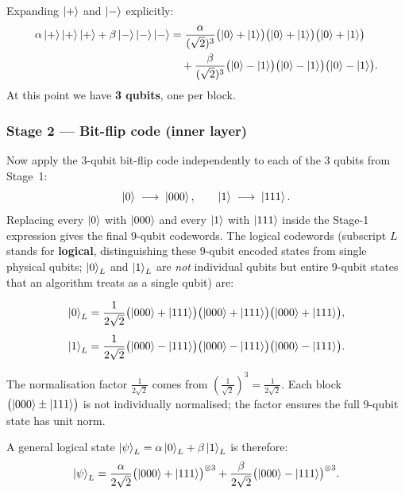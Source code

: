 \documentclass[11pt, a4paper]{article}
\theoremstyle{definition}
\theoremstyle{plain}
\theoremstyle{remark}
\begin{document}
\medskip
Expanding $\ket{+}$ and $\ket{-}$ explicitly:
\begin{align*}
  \alpha\ket{+}\ket{+}\ket{+} + \beta\ket{-}\ket{-}\ket{-}
  &= \frac{\alpha}{(\sqrt{2})^3}
    \bigl(\ket{0}+\ket{1}\bigr)
    \bigl(\ket{0}+\ket{1}\bigr)
    \bigl(\ket{0}+\ket{1}\bigr)\\
  &\quad+\frac{\beta}{(\sqrt{2})^3}
    \bigl(\ket{0}-\ket{1}\bigr)
    \bigl(\ket{0}-\ket{1}\bigr)
    \bigl(\ket{0}-\ket{1}\bigr).
\end{align*}
At this point we have \textbf{3 qubits}, one per block.

\subsubsection*{Stage 2 --- Bit-flip code (inner layer)}

Now apply the 3-qubit bit-flip code independently to each of the 3 qubits
from Stage~1:
\[
  \ket{0} \;\longrightarrow\; \ket{000}, \qquad
  \ket{1} \;\longrightarrow\; \ket{111}.
\]
Replacing every $\ket{0}$ with $\ket{000}$ and every $\ket{1}$ with
$\ket{111}$ inside the Stage-1 expression gives the final 9-qubit
codewords. The logical codewords (subscript $L$ stands for \textbf{logical},
distinguishing these 9-qubit encoded states from single physical qubits;
$\ket{0}_L$ and $\ket{1}_L$ are \emph{not} individual qubits but entire
9-qubit states that an algorithm treats as a single qubit) are:

\begin{align}
  \ket{0}_L &= \frac{1}{2\sqrt{2}}
    \bigl(\ket{000}+\ket{111}\bigr)
    \bigl(\ket{000}+\ket{111}\bigr)
    \bigl(\ket{000}+\ket{111}\bigr), \label{eq:shor-0}\\[4pt]
  \ket{1}_L &= \frac{1}{2\sqrt{2}}
    \bigl(\ket{000}-\ket{111}\bigr)
    \bigl(\ket{000}-\ket{111}\bigr)
    \bigl(\ket{000}-\ket{111}\bigr). \label{eq:shor-1}
\end{align}


\begin{keypoint}
The normalisation factor $\tfrac{1}{2\sqrt{2}}$ comes from
$\left(\tfrac{1}{\sqrt{2}}\right)^3 = \tfrac{1}{2\sqrt{2}}$.
Each block $\bigl(\ket{000}\pm\ket{111}\bigr)$ is not individually
normalised; the factor ensures the full 9-qubit state has unit norm.
\end{keypoint}

A general logical state $\ket{\psi}_L = \alpha\ket{0}_L + \beta\ket{1}_L$
is therefore:
\[
  \ket{\psi}_L
  = \frac{\alpha}{2\sqrt{2}}
    \bigl(\ket{000}+\ket{111}\bigr)^{\otimes 3}
  + \frac{\beta}{2\sqrt{2}}
    \bigl(\ket{000}-\ket{111}\bigr)^{\otimes 3}.
\]
\end{document}
